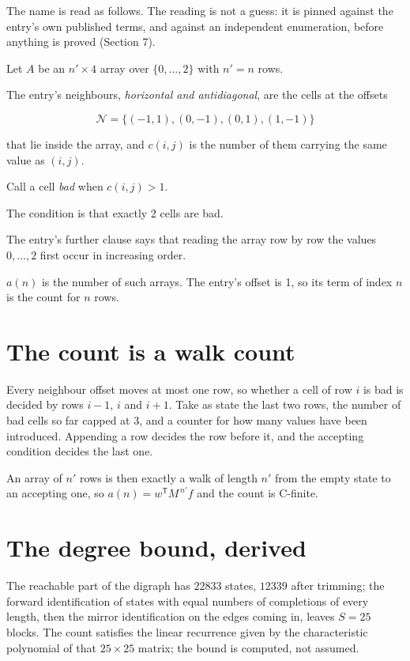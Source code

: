 \documentclass[11pt]{article}
\theoremstyle{definition}
\begin{document}
The name is read as follows. The reading is not a guess: it is pinned against the entry's own published terms, and against an independent enumeration, before anything is proved (Section 7).

Let $A$ be an $n' \times 4$ array over $\{0,\dots,2\}$ with $n' = n$ rows.

The entry's neighbours, {\itshape horizontal and antidiagonal}, are the cells at the offsets

\[\mathcal{N} = \{(-1,1), (0,-1), (0,1), (1,-1)\}\]

that lie inside the array, and $c(i,j)$ is the number of them carrying the same value as $(i,j)$.

Call a cell {\itshape bad} when $c(i,j) > 1$.

The condition is that exactly 2 cells are bad.

The entry's further clause says that reading the array row by row the values $0,\dots,2$ first occur in increasing order.

$a(n)$ is the number of such arrays. The entry's offset is 1, so its term of index $n$ is the count for $n$ rows.

\section{The count is a walk count}

Every neighbour offset moves at most one row, so whether a cell of row $i$ is bad is decided by rows $i-1$, $i$ and $i+1$. Take as state the last two rows, the number of bad cells so far capped at 3, and a counter for how many values have been introduced. Appending a row decides the row before it, and the accepting condition decides the last one.

An array of $n'$ rows is then exactly a walk of length $n'$ from the empty state to an accepting one, so $a(n) = w^{\mathsf T}M^{\,n'}f$ and the count is C-finite.

\section{The degree bound, derived}

The reachable part of the digraph has $22833$ states, $12339$ after trimming; the forward identification of states with equal numbers of completions of every length, then the mirror identification on the edges coming in, leaves $S = 25$ blocks. The count satisfies the linear recurrence given by the characteristic polynomial of that $25\times25$ matrix; the bound is computed, not assumed.
\end{document}
